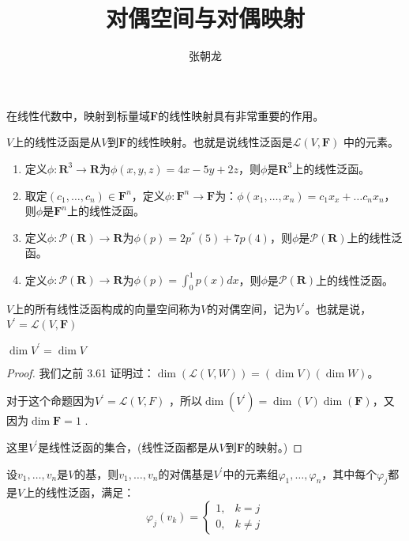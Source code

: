 \documentclass[10pt,a4paper,UTF8]{article}
\author{张朝龙}
\date{}
\title{对偶空间与对偶映射}
\begin{document}
\maketitle
在线性代数中，映射到标量域\(\mathbf{F}\)的线性映射具有非常重要的作用。
\begin{definition}
\(V\)上的线性泛函是从\(V\)到\(\mathbf{F}\)的线性映射。也就是说线性泛函是\(\mathcal{L}(V,\mathbf{F})\) 中的元素。
\end{definition}

\begin{instance}
\begin{enumerate}
\item 定义\(\phi: \mathbf{R}^{3} \rightarrow \mathbf{R}\)为\(\phi(x,y,z) = 4x-5y + 2z\)，则\(\phi\)是\(\mathbf{R}^{3}\)上的线性泛函。
\item 取定\((c_{1},\ldots ,c_{n})\in \mathbf{F}^{n}\)，定义\(\phi : \mathbf{F}^{n} \rightarrow \mathbf{F}\)为：\(\phi(x_{1},\ldots ,x_{n}) = c_{1}x_{x} + \ldots c_{n}x_{n}\)，则\(\phi\)是\(\mathbf{F}^{n}\)上的线性泛函。
\item 定义\(\phi: \mathcal{P}( \mathbf{R}) \rightarrow \mathbf{R}\)为\(\phi(p) = 2p^{''}(5) + 7p(4)\)，则\(\phi\)是\(\mathcal{P}( \mathbf{R})\)上的线性泛函。
\item 定义\(\phi: \mathcal{P}(\mathbf{R}) \rightarrow \mathbf{R}\)为\(\phi(p)=\int_{0}^{1} p(x)dx\)，则\(\phi\)是\(\mathcal{P}(\mathbf{R})\)上的线性泛函。
\end{enumerate}
\end{instance}

\begin{definition}
\(V\)上的所有线性泛函构成的向量空间称为\(V\)的对偶空间，记为\(V^{'}\)。也就是说，\(V^{'} = \mathcal{L}(V, \mathbf{F})\)
\end{definition}

\begin{theorem}
\(\dim V^{'} = \dim V\)
\end{theorem}

\begin{proof}
我们之前 3.61 证明过：\(\dim(\mathcal{L}(V,W)) = (\dim V)(\dim W)\)。

对于这个命题因为\(V^{'} = \mathcal{L}(V,F)\) ，所以\(\dim(V^{'}) = \dim(V)\dim(\mathbf{F})\)，又因为\(\dim \mathbf{F} = 1\) .

这里\(V^{'}\)是线性泛函的集合，(线性泛函都是从\(V\)到\(\mathbf{F}\)的映射。)
\end{proof}

\begin{definition}
设\(v_{1},\ldots ,v_{n}\)是\(V\)的基，则\(v_{1},\ldots ,v_{n}\)的对偶基是\(V^{'}\)中的元素组\(\varphi_{1}, \ldots ,\varphi_{n}\)，其中每个\(\varphi_{j}\)都是\(V\)上的线性泛函，满足：
\begin{equation}
\label{eq:1}
\varphi_{j}(v_{k}) = 
\begin{cases}
1, & k=j \\
0, & k\neq j 
\end{cases}
\end{equation}
\end{definition}
\end{document}
